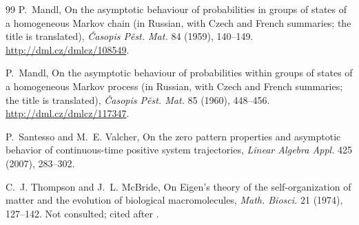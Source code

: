 \documentclass[11pt]{article}
\theoremstyle{definition}
\theoremstyle{remark}
\begin{document}
\begin{thebibliography}{99}
P.~Mandl,
On the asymptotic behaviour of probabilities in groups of states of a homogeneous Markov chain
(in Russian, with Czech and French summaries; the title is translated),
\emph{\v{C}asopis P\v{e}st. Mat.} 84 (1959), 140--149.
\url{http://dml.cz/dmlcz/108549}.

P.~Mandl,
On the asymptotic behaviour of probabilities within groups of states of a homogeneous Markov
process (in Russian, with Czech and French summaries; the title is translated),
\emph{\v{C}asopis P\v{e}st. Mat.} 85 (1960), 448--456.
\url{http://dml.cz/dmlcz/117347}.

P.~Santesso and M.~E. Valcher,
On the zero pattern properties and asymptotic behavior of continuous-time positive system
trajectories,
\emph{Linear Algebra Appl.} 425 (2007), 283--302.

C.~J. Thompson and J.~L. McBride,
On Eigen's theory of the self-organization of matter and the evolution of biological
macromolecules,
\emph{Math. Biosci.} 21 (1974), 127--142.
Not consulted; cited after \cite{EMS88}.

\end{thebibliography}
\end{document}
